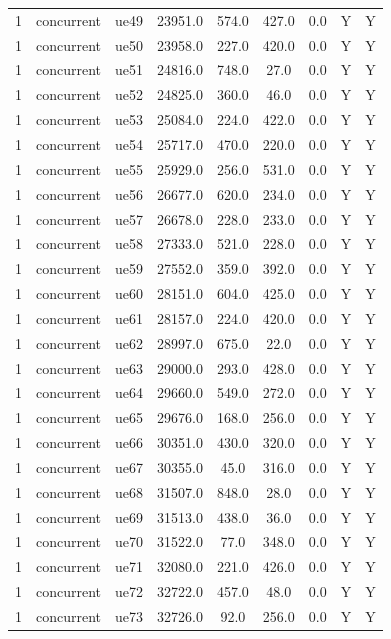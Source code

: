\begin{table}[ht]
\begin{tabular}{|c|c|c|c|c|c|c|c|c|}
1 & concurrent & ue49 & 23951.0 & 574.0 & 427.0 & 0.0 & Y & Y \\
1 & concurrent & ue50 & 23958.0 & 227.0 & 420.0 & 0.0 & Y & Y \\
1 & concurrent & ue51 & 24816.0 & 748.0 & 27.0 & 0.0 & Y & Y \\
1 & concurrent & ue52 & 24825.0 & 360.0 & 46.0 & 0.0 & Y & Y \\
1 & concurrent & ue53 & 25084.0 & 224.0 & 422.0 & 0.0 & Y & Y \\
1 & concurrent & ue54 & 25717.0 & 470.0 & 220.0 & 0.0 & Y & Y \\
1 & concurrent & ue55 & 25929.0 & 256.0 & 531.0 & 0.0 & Y & Y \\
1 & concurrent & ue56 & 26677.0 & 620.0 & 234.0 & 0.0 & Y & Y \\
1 & concurrent & ue57 & 26678.0 & 228.0 & 233.0 & 0.0 & Y & Y \\
1 & concurrent & ue58 & 27333.0 & 521.0 & 228.0 & 0.0 & Y & Y \\
1 & concurrent & ue59 & 27552.0 & 359.0 & 392.0 & 0.0 & Y & Y \\
1 & concurrent & ue60 & 28151.0 & 604.0 & 425.0 & 0.0 & Y & Y \\
1 & concurrent & ue61 & 28157.0 & 224.0 & 420.0 & 0.0 & Y & Y \\
1 & concurrent & ue62 & 28997.0 & 675.0 & 22.0 & 0.0 & Y & Y \\
1 & concurrent & ue63 & 29000.0 & 293.0 & 428.0 & 0.0 & Y & Y \\
1 & concurrent & ue64 & 29660.0 & 549.0 & 272.0 & 0.0 & Y & Y \\
1 & concurrent & ue65 & 29676.0 & 168.0 & 256.0 & 0.0 & Y & Y \\
1 & concurrent & ue66 & 30351.0 & 430.0 & 320.0 & 0.0 & Y & Y \\
1 & concurrent & ue67 & 30355.0 & 45.0 & 316.0 & 0.0 & Y & Y \\
1 & concurrent & ue68 & 31507.0 & 848.0 & 28.0 & 0.0 & Y & Y \\
1 & concurrent & ue69 & 31513.0 & 438.0 & 36.0 & 0.0 & Y & Y \\
1 & concurrent & ue70 & 31522.0 & 77.0 & 348.0 & 0.0 & Y & Y \\
1 & concurrent & ue71 & 32080.0 & 221.0 & 426.0 & 0.0 & Y & Y \\
1 & concurrent & ue72 & 32722.0 & 457.0 & 48.0 & 0.0 & Y & Y \\
1 & concurrent & ue73 & 32726.0 & 92.0 & 256.0 & 0.0 & Y & Y \\

\end{tabular}
\end{table}
